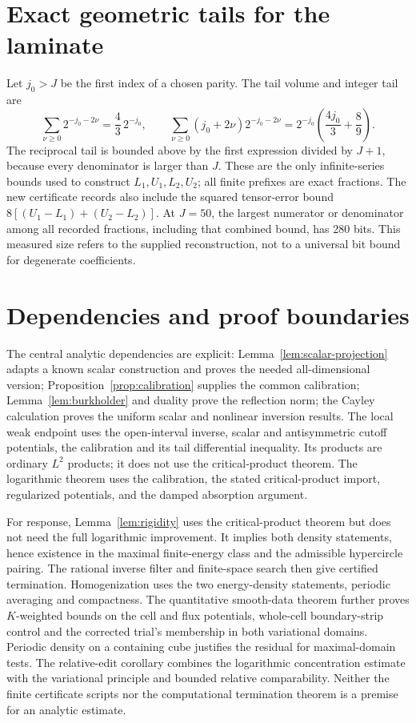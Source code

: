 \documentclass[11pt,a4paper]{article}
\numberwithin{equation}{section}
\theoremstyle{definition}
\theoremstyle{remark}\newtheorem{remark}[theorem]{Remark}
\begin{document}
\section{Exact geometric tails for the laminate}\label{app:laminate}

Let \(j_0>J\) be the first index of a chosen parity. The tail volume
and integer tail are
\[
 \sum_{\nu\geq0}2^{-j_0-2\nu}
     =\frac43\,2^{-j_0},\qquad
 \sum_{\nu\geq0}(j_0+2\nu)2^{-j_0-2\nu}
     =2^{-j_0}\left(\frac{4j_0}3+\frac89\right).
\]
The reciprocal tail is bounded above by the first expression
divided by \(J+1\), because every denominator is larger than \(J\).
These are the only infinite-series bounds used to construct
\(L_1,U_1,L_2,U_2\); all finite prefixes are exact fractions.
The new certificate records also include the squared tensor-error
bound \(8[(U_1-L_1)+(U_2-L_2)]\).
At \(J=50\), the largest numerator or denominator among all recorded
fractions, including that combined bound, has 280 bits.
This measured size refers to the supplied reconstruction, not to a
universal bit bound for degenerate coefficients.

\section{Dependencies and proof boundaries}\label{app:dependencies}

The central analytic dependencies are explicit:
Lemma~\ref{lem:scalar-projection} adapts a known scalar construction
and proves the needed all-dimensional version;
Proposition~\ref{prop:calibration} supplies the common calibration;
Lemma~\ref{lem:burkholder} and duality prove the reflection norm;
the Cayley calculation proves the uniform scalar and nonlinear
inversion results. The local weak endpoint uses the open-interval
inverse, scalar and antisymmetric cutoff potentials, the calibration
and its tail differential inequality. Its products are ordinary
\(L^2\) products; it does not use the critical-product theorem.
The logarithmic theorem uses the calibration,
the stated critical-product import, regularized potentials, and
the damped absorption argument.

For response, Lemma~\ref{lem:rigidity} uses the critical-product theorem
but does not need the full logarithmic improvement. It implies
both density statements, hence existence in the maximal finite-energy
class and the admissible hypercircle pairing.
The rational inverse filter and finite-space search then give
certified termination. Homogenization uses the two energy-density
statements, periodic averaging and compactness. The quantitative
smooth-data theorem further proves \(K\)-weighted bounds on the
cell and flux potentials, whole-cell boundary-strip control and
the corrected trial's membership in both variational domains.
Periodic density on a containing cube justifies the residual for
maximal-domain tests. The relative-edit corollary combines the
logarithmic concentration estimate with the variational principle
and bounded relative comparability.
Neither the finite certificate scripts nor the computational
termination theorem is a premise for an analytic estimate.
\end{document}

